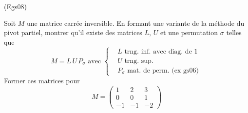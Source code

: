 \begin{tiny}(Egs08)\end{tiny} Soit $M$ une matrice carrée inversible. En formant une variante de la méthode du pivot partiel, montrer qu'il existe des matrices $L$, $U$ et une permutation $\sigma$ telles que
\begin{displaymath}
  M = L\,U\,P_{\sigma}\text{ avec }
\left\lbrace 
\begin{aligned}
  &L\text{ trng. inf. avec diag. de 1 }\\
  &U\text{ trng. sup.} \\
  &P_{\sigma} \text{ mat. de perm. (ex gs06)}
\end{aligned}
\right. 
\end{displaymath}
Former ces matrices pour 
\begin{displaymath}
  M=
\begin{pmatrix}
  1 & 2 & 3 \\
  0 & 0 & 1 \\
  -1 & -1 & -2
\end{pmatrix}
\end{displaymath}
